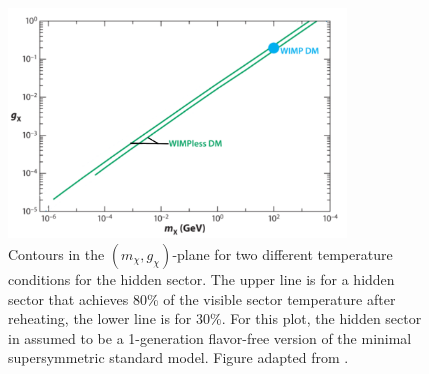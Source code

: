 \begin{figure}[htbp]
\begin{center}
\includegraphics[width=0.8\textwidth]{figures/theory/wimpless_miracle.png}
\caption{Contours in the $(m_{\chi}, g_{\chi})$-plane for two different temperature conditions for the hidden sector. The upper line is for a hidden sector that achieves 80\% of the visible sector temperature after reheating, the lower line is for 30\%. For this plot, the hidden sector in assumed to be a 1-generation flavor-free version of the minimal supersymmetric standard model. Figure adapted from \cite{Feng2010}. }
\label{fig:wimpless_miracle}
\end{center}
\end{figure}

